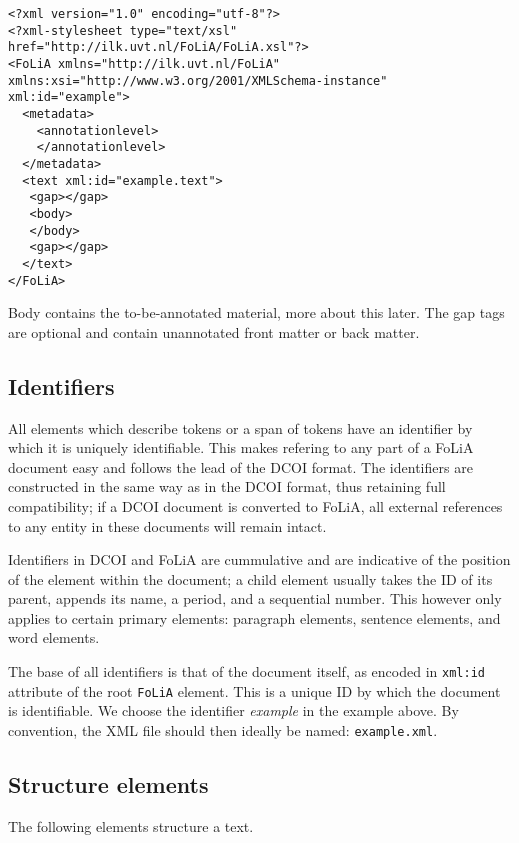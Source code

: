\begin{verbatim}
<?xml version="1.0" encoding="utf-8"?>
<?xml-stylesheet type="text/xsl" href="http://ilk.uvt.nl/FoLiA/FoLiA.xsl"?>
<FoLiA xmlns="http://ilk.uvt.nl/FoLiA" xmlns:xsi="http://www.w3.org/2001/XMLSchema-instance" xml:id="example">
  <metadata> 
    <annotationlevel>
    </annotationlevel>
  </metadata>  
  <text xml:id="example.text">
   <gap></gap>
   <body>
   </body>
   <gap></gap>
  </text>
</FoLiA>  
\end{verbatim}

Body contains the to-be-annotated material, more about this later. The gap tags are optional and contain unannotated front matter or back matter.

\subsection{Identifiers}

All elements which describe tokens or a span of tokens have an identifier by which it is uniquely identifiable. This makes refering to any part of a FoLiA document easy and follows the lead of the DCOI format. The identifiers are constructed in the same way as in the DCOI format, thus retaining full compatibility; if a DCOI document is converted to FoLiA, all external references to any entity in these documents will remain intact.

Identifiers in DCOI and FoLiA are cummulative and are indicative of the position of the element within the document; a child element usually takes the ID of its parent, appends its name, a period, and a sequential number. This however only applies to certain primary elements: paragraph elements, sentence elements, and word elements.

The base of all identifiers is that of the document itself, as encoded in \texttt{xml:id} attribute of the root \texttt{FoLiA} element. This is a unique ID by which the document is identifiable. We choose the identifier \emph{example} in the example above. By convention, the XML file should then ideally be named: \texttt{example.xml}.


\subsection{Structure elements}

The following elements structure a text.

